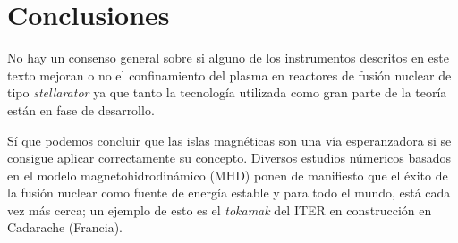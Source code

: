\chapter{Conclusiones}
No hay un consenso general sobre si alguno de los instrumentos descritos en este
texto mejoran o no el confinamiento del plasma en reactores de fusión nuclear de tipo
\textit{stellarator} ya que tanto la tecnología utilizada como 
gran parte de la teoría están en fase de desarrollo.\par
Sí que podemos concluir que las islas magnéticas son una vía esperanzadora si se
consigue aplicar correctamente su concepto. 
Diversos estudios númericos basados en el modelo magnetohidrodinámico (MHD)
ponen de manifiesto que el éxito de la fusión nuclear como fuente de energía
estable y para todo el mundo, está cada vez más cerca; un ejemplo de esto 
es el \textit{tokamak} del ITER en construcción en Cadarache (Francia).